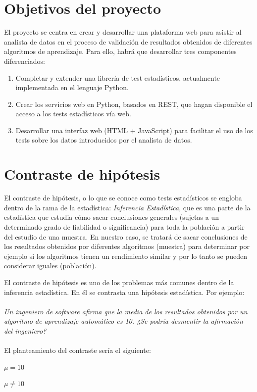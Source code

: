 
\section{Objetivos del proyecto}
El proyecto se centra en crear y desarrollar una plataforma web para asistir al analista de datos
en el proceso de validación de resultados obtenidos de diferentes algoritmos de aprendizaje.
Para ello, habrá que desarrollar tres componentes diferenciados:
\begin{enumerate}
\item Completar y extender una librería de test estadísticos, actualmente implementada en el
lenguaje Python.
\item Crear los servicios web en Python, basados en REST, que hagan disponible el acceso a los
tests estadísticos vía web.
\item Desarrollar una interfaz web (HTML + JavaScript) para facilitar el uso de los tests sobre los
datos introducidos por el analista de datos.
\end{enumerate}


\section{Contraste de hipótesis}
El contraste de hipótesis, o lo que se conoce como tests estadísticos se engloba dentro de la rama de la
estadística: \textit{Inferencia Estadística}, que es una parte de la estadística que estudia cómo sacar
conclusiones generales (sujetas a un determinado grado de fiabilidad o significancia) para toda la población
a partir del estudio de una muestra. En nuestro caso, se tratará de sacar conclusiones de los resultados
obtenidos por diferentes algoritmos (muestra) para determinar por ejemplo si los algoritmos tienen un
rendimiento similar y por lo tanto se pueden considerar iguales (población).

El contraste de hipótesis es uno de los problemas más comunes dentro de la inferencia estadística. En él se
contrasta una hipótesis estadística. Por ejemplo:\\\\
\textit{Un ingeniero de software afirma que la media de los resultados obtenidos por un algoritmo
de aprendizaje automático es 10. ¿Se podría desmentir la afirmación del ingeniero?}\\\\
El planteamiento del contraste sería el siguiente:
\begin{center}
$ \mu = 10 $

$ \mu \neq 10 $
\end{center}

